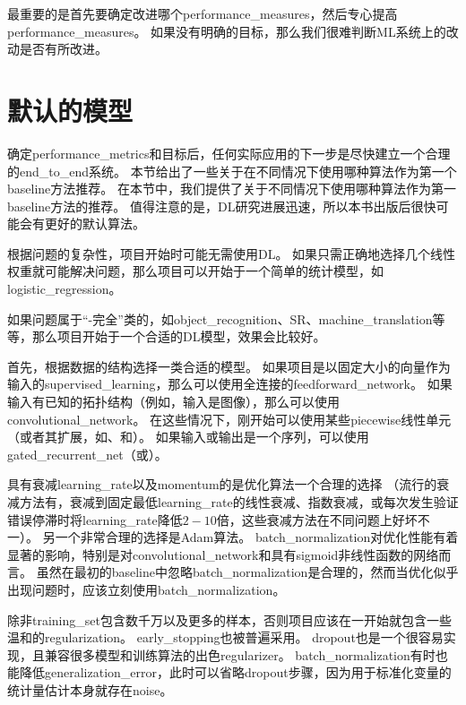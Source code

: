 最重要的是首先要确定改进哪个\gls{performance_measures}，然后专心提高\gls{performance_measures}。
如果没有明确的目标，那么我们很难判断\gls{ML}系统上的改动是否有所改进。


\section{默认的模型}
\label{sec:default_baseline_models}
确定\gls{performance_metrics}和目标后，任何实际应用的下一步是尽快建立一个合理的\gls{end_to_end}系统。
本节给出了一些关于在不同情况下使用哪种算法作为第一个\gls{baseline}方法推荐。
在本节中，我们提供了关于不同情况下使用哪种算法作为第一\gls{baseline}方法的推荐。
值得注意的是，\gls{DL}研究进展迅速，所以本书出版后很快可能会有更好的默认算法。

根据问题的复杂性，项目开始时可能无需使用\gls{DL}。
如果只需正确地选择几个线性权重就可能解决问题，那么项目可以开始于一个简单的统计模型，如\gls{logistic_regression}。


如果问题属于``-完全''类的，如\gls{object_recognition}、\gls{SR}、\gls{machine_translation}等等，那么项目开始于一个合适的\gls{DL}模型，效果会比较好。


首先，根据数据的结构选择一类合适的模型。
如果项目是以固定大小的向量作为输入的\gls{supervised_learning}，那么可以使用全连接的\gls{feedforward_network}。
如果输入有已知的拓扑结构（例如，输入是图像），那么可以使用\gls{convolutional_network}。
在这些情况下，刚开始可以使用某些\gls{piecewise}线性单元（或者其扩展，如、和）。
如果输入或输出是一个序列，可以使用\gls{gated_recurrent_net}（或）。

具有衰减\gls{learning_rate}以及\gls{momentum}的是优化算法一个合理的选择
（流行的衰减方法有，衰减到固定最低\gls{learning_rate}的线性衰减、指数衰减，或每次发生验证错误停滞时将\gls{learning_rate}降低$2-10$倍，这些衰减方法在不同问题上好坏不一）。
另一个非常合理的选择是Adam算法。
\gls{batch_normalization}对优化性能有着显著的影响，特别是对\gls{convolutional_network}和具有\gls{sigmoid}非线性函数的网络而言。
虽然在最初的\gls{baseline}中忽略\gls{batch_normalization}是合理的，然而当优化似乎出现问题时，应该立刻使用\gls{batch_normalization}。


除非\gls{training_set}包含数千万以及更多的样本，否则项目应该在一开始就包含一些温和的\gls{regularization}。 
\gls{early_stopping}也被普遍采用。
\gls{dropout}也是一个很容易实现，且兼容很多模型和训练算法的出色\gls{regularizer}。
\gls{batch_normalization}有时也能降低\gls{generalization_error}，此时可以省略\gls{dropout}步骤，因为用于标准化变量的统计量估计本身就存在\gls{noise}。 %


